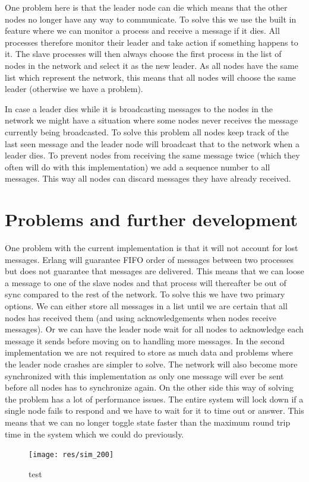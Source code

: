 One problem here is that the leader node can die which means that the other nodes no longer have any way to communicate. To solve this we use the built in feature where we can monitor a process and receive a message if it dies. All processes therefore monitor their leader and take action if something happens to it. The slave processes will then always choose the first process in the list of nodes in the network and select it as the new leader. As all nodes have the same list which represent the network, this means that all nodes will choose the same leader (otherwise we have a problem). 

In case a leader dies while it is broadcasting messages to the nodes in the network we might have a situation where some nodes never receives the message currently being broadcasted. To solve this problem all nodes keep track of the last seen message and the leader node will broadcast that to the network when a leader dies. To prevent nodes from receiving the same message twice (which they often will do with this implementation) we add a sequence number to all messages. This way all nodes can discard messages they have already received.

\section{Problems and further development}
One problem with the current implementation is that it will not account for lost messages. Erlang will guarantee FIFO order of messages between two processes but does not guarantee that messages are delivered. This means that we can loose a message to one of the slave nodes and that process will thereafter be out of sync compared to the rest of the network. To solve this we have two primary options. We can either store all messages in a list until we are certain that all nodes has received them (and using acknowledgements when nodes receive messages). Or we can have the leader node wait for all nodes to acknowledge each message it sends before moving on to handling more messages. In the second implementation we are not required to store as much data and problems where the leader node crashes are simpler to solve. The network will also become more synchronized with this implementation as only one message will ever be sent before all nodes has to synchronize again. On the other side this way of solving the problem has a lot of performance issues. The entire system will lock down if a single node fails to respond and we have to wait for it to time out or answer. This means that we can no longer toggle state faster than the maximum round trip time in the system which we could do previously.

\begin{figure}[h]
\centering
\texttt{[image: res/sim\_200]}
\caption{test}
\label{fig:sim_200}
\end{figure}
